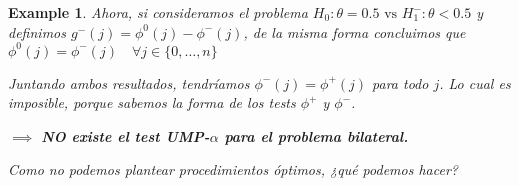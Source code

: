 \documentclass{article}
\theoremstyle{remarkstyle}
\theoremstyle{examplestyle}
\newtheorem*{example}{Example}
\theoremstyle{definitionstyle}
\theoremstyle{lemmastyle}
\theoremstyle{theoremstyle}
\begin{document}
\begin{example}
Ahora, si consideramos el problema $H_0: \theta=0.5 \text{ vs } H_1^-: \theta < 0.5$ y definimos $g^-(j) = \phi^0(j) - \phi^-(j)$, de la misma forma concluimos que
$\phi^0(j) = \phi^-(j) \quad \forall j \in \{0, \dots, n\}$

Juntando ambos resultados, tendríamos $\phi^-(j) = \phi^+(j)$ para todo $j$.
Lo cual es imposible, porque sabemos la forma de los tests $\phi^+$ y $\phi^-$.

$\implies$ \textbf{NO existe el test UMP-$\alpha$ para el problema bilateral.}

Como no podemos plantear procedimientos óptimos, ¿qué podemos hacer?
\end{example}
\end{document}
